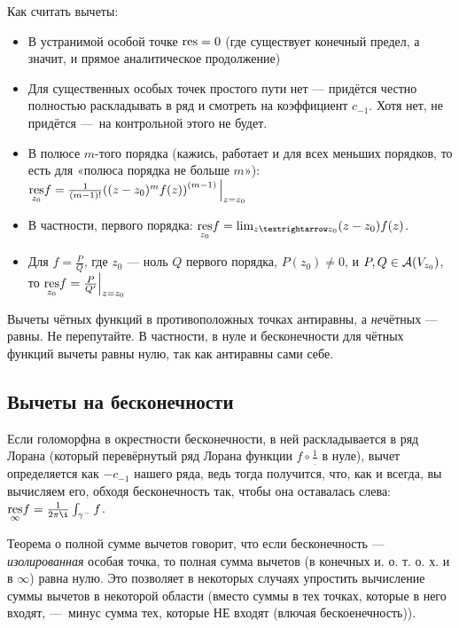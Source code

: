 \documentclass[12pt, a4paper]{article}
\begin{document}
Как считать вычеты:
\begin{itemize}
  \item В устранимой особой точке $\operatorname{res} = 0$ (где существует конечный предел, а значит, и прямое аналитическое продолжение)
  \item Для существенных особых точек простого пути нет — придётся честно полностью раскладывать в ряд и смотреть на коэффициент $c_{-1}$. Хотя нет, не придётся — на контрольной этого не будет.
  \item В полюсе $m$-того порядка (кажись, работает и для всех меньших порядков, то есть для «полюса порядка не больше $m$»):
  $\underset{z_0}{\res} f = \frac{1}{(m - 1)!} \restr{\left((z - z_0)^m f(z)\right)^{(m - 1)}}{z = z_0}$
  \item В частности, первого порядка: $\underset{z_0}{\res} f = \lim_{z → z_0} (z - z_0) f(z)$.
  \item Для $f = \frac{P}{Q}$, где $z_0$ — ноль $Q$ первого порядка, $P(z_0) ≠ 0$, и $P, Q \in {\mathcal{A}}(V_{z_0})$, то $\underset{z_0}{\res} f = \restr{\frac{P}{Q'}}{z = z_0}$
\end{itemize}

\begin{remark}\label{rem:res_inversed}
  Вычеты чётных функций в противоположных точках антиравны, а \textit{не}чётных — равны. Не перепутайте.
  В частности, в нуле и бесконечности для чётных функций вычеты равны нулю, так как антиравны сами себе.
\end{remark}

\subsection{Вычеты на бесконечности}

Если голоморфна в окрестности бесконечности, в ней раскладывается в ряд Лорана
(который перевёрнутый ряд Лорана функции $f \circ \frac{1}{.}$ в нуле), вычет определяется как $-c_{-1}$ нашего ряда,
ведь тогда получится, что, как и всегда, вы вычисляем его, обходя бесконечность так, чтобы она оставалась слева:
$\underset{\infty}{\res} f = \frac{1}{2 \pi \i}\int_{\gamma^{-}} f$.

Теорема о полной сумме вычетов говорит, что если бесконечность — \textit{изолированная} особая точка,
то полная сумма вычетов (в конечных и. о. т. о. х. и в $∞$) равна нулю.
Это позволяет в некоторых случаях упростить вычисление суммы вычетов в некоторой области
(вместо суммы в тех точках, которые в него входят, — минус сумма тех, которые НЕ входят (влючая бескоенечность)).
\end{document}
